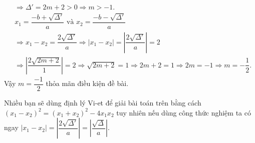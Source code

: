 \begin{vd}
{	$$\begin{aligned}
		&\Rightarrow \Delta '=2m+2>0\Rightarrow m>-1.\\
		&x_1=\dfrac{-b+\sqrt{\Delta '}}{a}\text{ và } x_2=\dfrac{-b-\sqrt{\Delta '}}{a} \\
		&\Rightarrow x_1-x_2=\dfrac{2\sqrt{\Delta '}}{a}	
		\Rightarrow \left| x_1-x_2 \right|=\left| \dfrac{2\sqrt{\Delta '}}{a} \right|=2\\
		&\Rightarrow \left| \dfrac{2\sqrt{2m+2}}{1} \right|=2\Rightarrow \sqrt{2m+2}=1\Rightarrow 2m+2=1
		\Rightarrow 2m=-1\Rightarrow m=-\dfrac{1}{2}.
	\end{aligned}
	$$
	Vậy $m=\dfrac{-1}{2}$ thỏa mãn điều kiện đề bài.
	}
\end{vd}
\begin{nx}
	Nhiều bạn sẽ dùng định lý Vi-et để giải bài toán trên bằng cách ${{\left( x_1-x_2 \right)}^{2}}={{\left( x_1+x_2 \right)}^{2}}-4x_1x_2$ tuy nhiên nếu dùng công thức nghiệm ta có ngay $\left| x_1-x_2 \right|=\left| \dfrac{2\sqrt{\Delta '}}{a} \right|=\left| \dfrac{\sqrt{\Delta }}{a} \right|$.
\end{nx}
